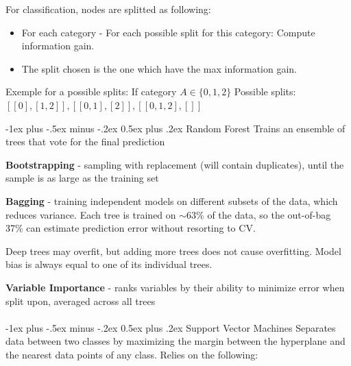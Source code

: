 \documentclass[10pt,landscape]{article}
\makeatletter
\renewcommand{\section}{\@startsection{section}{1}{0mm}%
                                {-1ex plus -.5ex minus -.2ex}%
                                {0.5ex plus .2ex}%
                                {\normalfont\large\bfseries}}
\renewcommand{\subsection}{\@startsection{subsection}{2}{0mm}%
                                {-1ex plus -.5ex minus -.2ex}%
                                {0.5ex plus .2ex}%
                                {\normalfont\normalsize\bfseries}}
\makeatother
\begin{document}
\begin{multicols}{3}
    \vspace{+1mm}
    For classification, nodes are splitted as following:
    \begin{itemize}[label={--},leftmargin=4mm]
        \vspace{-1mm}
        \itemsep -.4mm
        \item For each category
            \subitem - For each possible split for this category:
                Compute information gain.
        \item The split chosen is the one which have the max information gain.
    \end{itemize}
    Exemple for a possible splits:
        If category $A\in \{0,1,2\}$
        Possible splits:
        $[[0],[1,2]], [[0,1],[2]], [[0,1,2],[]]$

    \subsection{Random Forest}
    Trains an ensemble of trees that vote for the final prediction

    \textbf{Bootstrapping} - sampling with replacement (will contain duplicates), until the sample is as large as the training set

    \textbf{Bagging} - training independent models on different subsets of the data, which reduces variance. Each tree is trained on $\sim$63\% of the data, so the out-of-bag 37\% can estimate prediction error without resorting to CV.

    Deep trees may overfit, but adding more trees does not cause overfitting. Model bias is always equal to one of its individual trees.

    \textbf{Variable Importance} - ranks variables by their ability to minimize error when split upon, averaged across all trees
    \\\textcolor{white}{.}\vspace{-5mm}\\ %

    \section{Support Vector Machines}
    Separates data between two classes by maximizing the margin between the hyperplane and the nearest data points of any class. Relies on the following:
    

\end{multicols}
\end{document}
